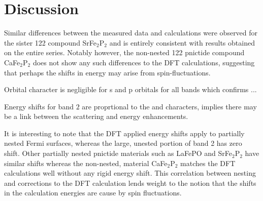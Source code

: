 
\section{Discussion}

Similar differences between the measured data and calculations were observed for the sister 122 compound SrFe$_2$P$_2$\cite{Analytis2009} and is entirely consistent with results obtained on the entire \BaFePAs series\cite{Shishido2010}. Notably however, the non-nested 122 pnictide compound CaFe$_2$P$_2$ does not show any such differences to the DFT calculations, suggesting that perhaps the shifts in energy may arise from spin-fluctuations.

Orbital character is negligible for s and p orbitals for all bands which confirms ...

Energy shifts for band $2$ are proprtional to the \DzTwo and \DxzDyz characters, implies there may be a link between the \kz scattering and energy enhancements.


It is interesting to note that the DFT applied energy shifts apply to partially nested Fermi surfaces, whereas the large, unested portion of band 2 has zero shift. Other partially nested pnictide materials such as LaFePO\cite{Carrington2009} and SrFe$_{2}$P$_{2}$\cite{Analytis2009} have similar shifts whereas the non-nested, material CaFe$_{2}$P$_{2}$\cite{Coldea2009} matches the DFT calculations well without any rigid energy shift. This correlation between nesting and corrections to the DFT calculation lends weight to the notion that the shifts in the calculation energies are cause by spin fluctuations.



